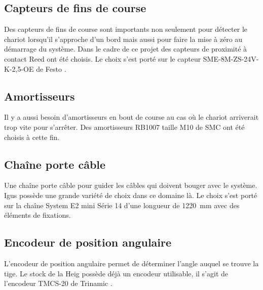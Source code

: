 \subsection{Capteurs de fins de course}
Des capteurs de fins de course sont importants non seulement pour détecter le chariot lorsqu'il s'approche d'un bord mais aussi
pour faire la mise à zéro au démarrage du système. Dans le cadre de ce projet des capteurs de proximité à contact Reed ont été choisis.
Le choix s'est porté sur le capteur SME-8M-ZS-24V-K-2,5-OE de Festo \cite{Festo}.

\subsection{Amortisseurs}
Il y a aussi besoin d'amortisseurs en bout de course au cas où le chariot arriverait trop vite pour s'arrêter. Des amortisseurs RB1007 taille M10
de SMC \cite{SMC} ont été choisis à cette fin.

\subsection{Chaîne porte câble}
Une chaîne porte câble pour guider les câbles qui doivent bouger avec le système. Igus \cite{Igus} possède une grande variété de choix dans
ce domaine là. Le choix s'est porté sur la chaîne System E2 mini Série 14 d'une longueur de 1220~mm avec des éléments de fixations.

\subsection{Encodeur de position angulaire}
L'encodeur de position angulaire permet de déterminer l'angle auquel se trouve la tige. Le stock de la \acrshort{Heig} possède déjà un encodeur
utilisable, il s'agit de l'encodeur TMCS-20 de Trinamic \cite{Trinamic}.